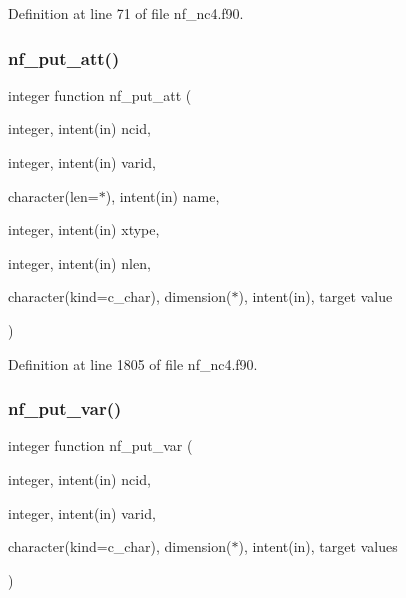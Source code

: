 Definition at line 71 of file nf\+\_\+nc4.\+f90.

\mbox{\label{nf__nc4_8f90_a732094664cbfe02baccb9f29bfd4aade}} 
\subsubsection{\texorpdfstring{nf\+\_\+put\+\_\+att()}{nf\_put\_att()}}
{\footnotesize\ttfamily integer function nf\+\_\+put\+\_\+att (\begin{DoxyParamCaption}\item[{integer, intent(in)}]{ncid,  }\item[{integer, intent(in)}]{varid,  }\item[{character(len=$\ast$), intent(in)}]{name,  }\item[{integer, intent(in)}]{xtype,  }\item[{integer, intent(in)}]{nlen,  }\item[{character(kind=c\+\_\+char), dimension($\ast$), intent(in), target}]{value }\end{DoxyParamCaption})}



Definition at line 1805 of file nf\+\_\+nc4.\+f90.

\mbox{\label{nf__nc4_8f90_a653feada4a0204bc113861fc56500b9f}} 
\subsubsection{\texorpdfstring{nf\+\_\+put\+\_\+var()}{nf\_put\_var()}}
{\footnotesize\ttfamily integer function nf\+\_\+put\+\_\+var (\begin{DoxyParamCaption}\item[{integer, intent(in)}]{ncid,  }\item[{integer, intent(in)}]{varid,  }\item[{character(kind=c\+\_\+char), dimension($\ast$), intent(in), target}]{values }\end{DoxyParamCaption})}



